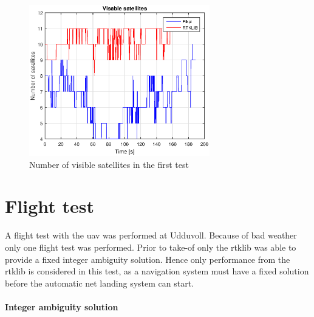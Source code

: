 \begin{figure}[H]
	\centering
		\includegraphics[width=0.7\textwidth]{figs/plots/numSatWalk2.eps}
		\caption{Number of visible satellites in the first test}
		\label{figure:numSatWalk2}
\end{figure}
\section{Flight test}
A flight test with the \gls{uav} was performed at Udduvoll. Because of bad weather only one flight test was performed. Prior to take-of only the \gls{rtklib} was able to provide a fixed integer ambiguity solution. Hence only performance from the \gls{rtklib} is considered in this test, as a navigation system must have a fixed solution before the automatic net landing system can start.

\paragraph{Integer ambiguity solution}~\\

